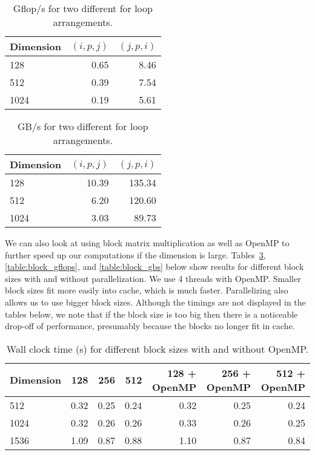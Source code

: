 \documentclass[12pt]{article}
\begin{document}
\begin{enumerate}
\begin{table}[H]
\centering
\begin{tabular}{| l | r | r |}
\hline
Dimension & $(i, p, j)$ & $(j,p,i)$\\
\hline
128 & 0.65 & 8.46 \\
\hline
512 & 0.39 & 7.54 \\
\hline
1024 & 0.19 & 5.61 \\
\hline
\end{tabular}
\caption{Gflop/s for two different for loop arrangements.}
\label{table:matmat_gflops}
\end{table}


\begin{table}[H]
\centering
\begin{tabular}{| l | r | r |}
\hline
Dimension & $(i, p, j)$ & $(j,p,i)$\\
\hline
128 & 10.39 & 135.34\\
\hline
512 & 6.20 & 120.60\\
\hline
1024 & 3.03 & 89.73\\
\hline
\end{tabular}
\caption{GB/s for two different for loop arrangements.}
\label{table:matmat_gbs}
\end{table}


We can also look at using block matrix multiplication as well as OpenMP to further speed up our computations if the dimension is large.  Tables~\ref{table:block_timings}, \ref{table:block_gflops}, and \ref{table:block_gbs} below show results for different block sizes with and without parallelization.  We use 4 threads with OpenMP.  Smaller block sizes fit more easily into cache, which is much faster.  Parallelizing also allows us to use bigger block sizes.  Although the timings are not displayed in the tables below, we note that if the block size is too big then there is a noticeable drop-off of performance, presumably because the blocks no longer fit in cache.

\begin{table}[H]
\centering
\begin{tabular}{| l | r | r | r | r | r | r |}
\hline
Dimension & 128 & 256 & 512 & 128 + OpenMP & 256 + OpenMP & 512 + OpenMP\\
\hline
512 & 0.32 & 0.25 &  0.24 & 0.32 &  0.25 & 0.24 \\
1024 & 0.32 & 0.26 & 0.26 & 0.33 & 0.26 & 0.25 \\
1536 & 1.09 & 0.87 & 0.88 & 1.10 & 0.87 & 0.84\\
\hline
\end{tabular}
\caption{Wall clock time (s) for different block sizes with and without OpenMP.}
\label{table:block_timings}
\end{table}



\end{enumerate}
\end{document}
